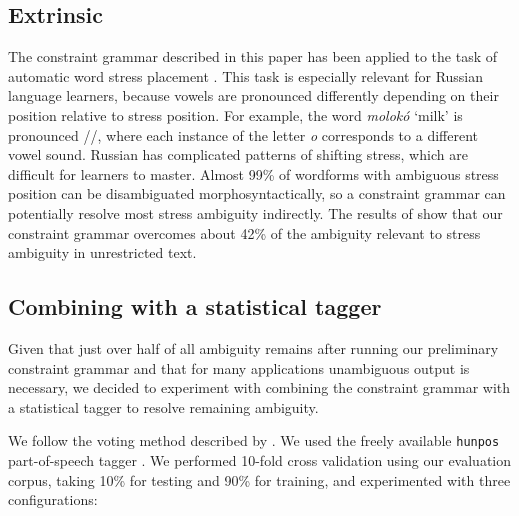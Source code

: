 \documentclass[11pt]{article}
\begin{document}



\subsection{Extrinsic}

The constraint grammar described in this paper has been applied to the task of automatic
word stress placement \cite{reynolds.tyers-15}. This task is especially relevant for 
Russian language learners, because vowels are pronounced differently depending on their position 
relative to stress position. For example, the word \emph{molokó} `milk' is pronounced 
//, where each instance of the letter \emph{o} corresponds to a different vowel sound. 
Russian has complicated patterns of shifting stress, which are difficult for learners to master.
Almost 99\% of wordforms with ambiguous stress position can be disambiguated morphosyntactically,
so a constraint grammar can potentially resolve most stress ambiguity indirectly. The results of  show that our constraint grammar overcomes about 42\% of the ambiguity relevant to stress
ambiguity in unrestricted text.

\subsection{Combining with a statistical tagger}

Given that just over half of all ambiguity remains after running our preliminary constraint
grammar and that for many applications unambiguous output is necessary, we decided to 
experiment with combining the constraint grammar with a statistical tagger to resolve remaining
ambiguity. 

We follow the voting method described by . We used the freely available
\texttt{hunpos} part-of-speech tagger \cite{halacsy07}. We performed 10-fold
cross validation using our evaluation corpus, taking 10\% for testing and 90\% for training, and
experimented with three configurations:
\end{document}
